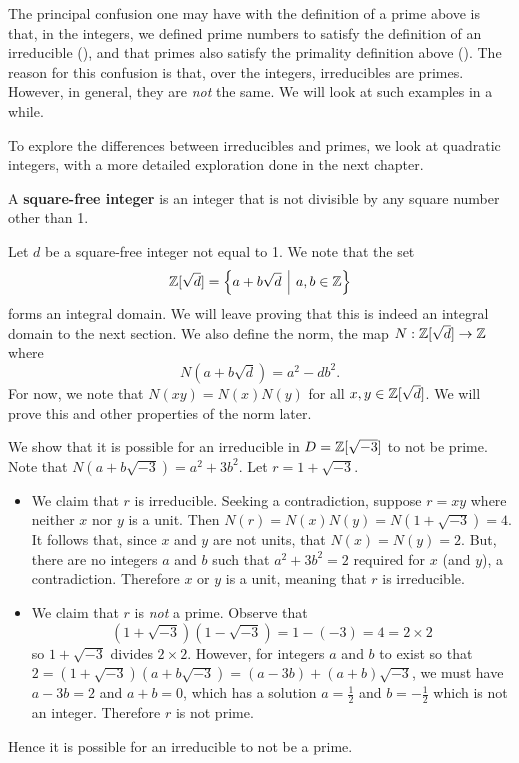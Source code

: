 The principal confusion one may have with the definition of a prime above is that, in the integers, we defined prime numbers to satisfy the definition of an irreducible (), and that primes also satisfy the primality definition above (). The reason for this confusion is that, over the integers, irreducibles are primes. However, in general, they are \textit{not} the same. We will look at such examples in a while.

To explore the differences between irreducibles and primes, we look at quadratic integers, with a more detailed exploration done in the next chapter.
\begin{definition}
    A \textbf{square-free integer} is an integer that is not divisible by any square number other than 1.
\end{definition}

Let $d$ be a square-free integer not equal to 1. We note that the set 
\[
    \Z[\sqrt{d}] = \left\{a + b\sqrt{d} \vert a,b \in \Z\right\}
\]
forms an integral domain. We will leave proving that this is indeed an integral domain to the next section. We also define the norm, the map $N: \mathbb{Z}[\sqrt{d}] \to \mathbb{Z}$ where
\[
    N(a+b\sqrt{d}) = a^2 - db^2.
\]
For now, we note that $N(xy) = N(x)N(y)$ for all $x, y \in \mathbb{Z}[\sqrt{d}]$. We will prove this and other properties of the norm later.

\begin{example}
    We show that it is possible for an irreducible in $D = \mathbb{Z}[\sqrt{-3}]$ to not be prime. Note that $N(a+b\sqrt{-3}) = a^2 + 3b^2$. Let $r = 1 + \sqrt{-3}$.
    \begin{itemize}
        \item We claim that $r$ is irreducible. Seeking a contradiction, suppose $r = xy$ where neither $x$ nor $y$ is a unit. Then $N(r) = N(x)N(y) = N(1+\sqrt{-3}) = 4$. It follows that, since $x$ and $y$ are not units, that $N(x) = N(y) = 2$. But, there are no integers $a$ and $b$ such that $a^2 + 3b^2 = 2$ required for $x$ (and $y$), a contradiction. Therefore $x$ or $y$ is a unit, meaning that $r$ is irreducible.

        \item We claim that $r$ is \textit{not} a prime. Observe that
        \[
            (1+\sqrt{-3})(1-\sqrt{-3}) = 1-(-3) = 4 = 2 \times 2
        \]
        so $1 + \sqrt{-3}$ divides $2 \times 2$. However, for integers $a$ and $b$ to exist so that $2 = (1+\sqrt{-3})(a+b\sqrt{-3}) = (a-3b) + (a+b)\sqrt{-3}$, we must have $a - 3b = 2$ and $a + b = 0$, which has a solution $a = \frac12$ and $b = -\frac12$ which is not an integer. Therefore $r$ is not prime.
    \end{itemize}
    Hence it is possible for an irreducible to not be a prime.
\end{example}

